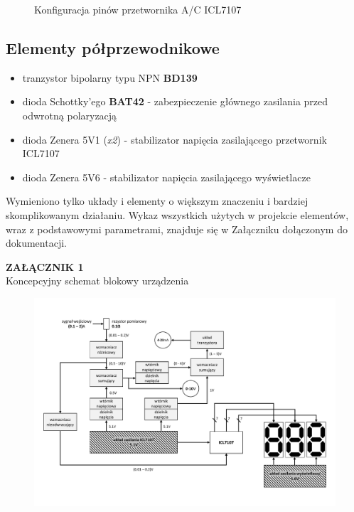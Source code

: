 \documentclass[12pt]{article}
\begin{document}
\begin{itemize}
\begin{figure}[h]
	\label{icl7107_pinout}
	\caption{Konfiguracja pinów przetwornika A/C ICL7107}
	\end{figure}
\end{itemize}
\subsection{Elementy półprzewodnikowe}
\begin{itemize}
	\item tranzystor bipolarny typu NPN \textbf{BD139}
	\item dioda Schottky'ego \textbf{BAT42} - zabezpieczenie głównego zasilania przed odwrotną polaryzacją
	\item dioda Zenera 5V1 (\textit{x2}) - stabilizator napięcia zasilającego przetwornik ICL7107
	\item dioda Zenera 5V6 - stabilizator napięcia zasilającego wyświetlacze
\end{itemize}
Wymieniono tylko układy i elementy o większym znaczeniu i bardziej skomplikowanym działaniu. Wykaz wszystkich użytych w projekcie elementów, wraz z podstawowymi parametrami, znajduje się w Załączniku dołączonym do dokumentacji.

\newpage

\begin{center}
\LARGE \textbf{ZAŁĄCZNIK 1} \\
\large Koncepcyjny schemat blokowy urządzenia \\
\end{center}

\begin{figure}[h!]
	\centering
	\includegraphics[scale=0.75, angle=-90, origin=c]{diagram_blokowy.png}
\end{figure}
	
\end{document}
